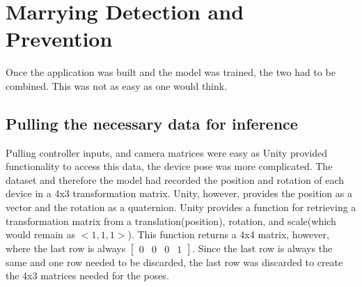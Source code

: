 \section{Marrying Detection and Prevention}
\label{sec:marrying}

Once the application was built and the model was trained, the two had to be combined.
This was not as easy as one would think.


\subsection{Pulling the necessary data for inference}
\label{subsec: pulling_data}

Pulling controller inputs, and camera matrices were easy as Unity provided functionality to access this data, the device pose was more complicated.
The dataset and therefore the model had recorded the position and rotation of each device in a 4x3 transformation matrix.
Unity, however, provides the position as a vector and the rotation as a quaternion\cite{voight2021quaternion}.
Unity provides a function for retrieving a transformation matrix from a translation(position), rotation, and scale(which would remain as $<1, 1, 1>$).
This function returns a 4x4 matrix, however, where the last row is always $\left[\begin{matrix} 0 & 0 & 0 & 1 \end{matrix}\right]$.
Since the last row is always the same and one row needed to be discarded, the last row was discarded to create the 4x3 matrices needed for the poses.

